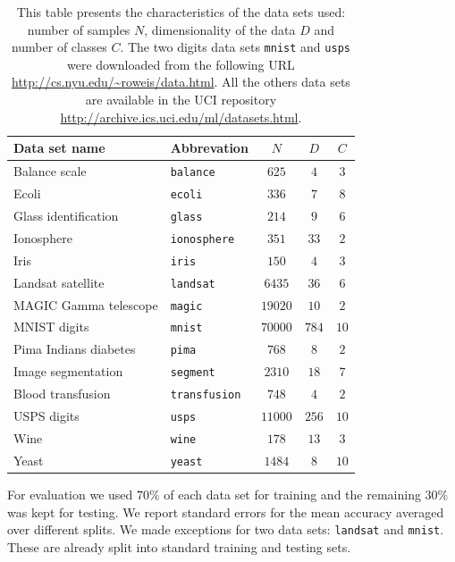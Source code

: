 \begin{table}%
  \centering
    \begin{tabular}{l l c c c} \toprule
	Data set name&Abbrevation&$N$&$D$&$C$\\ 
	\midrule
	Balance scale&\texttt{balance}&$625$&$4$&$3$\\ 
	Ecoli&\texttt{ecoli}&$336$&$7$&$8$\\ 
	Glass identification&\texttt{glass}&$214$&$9$&$6$\\ 
	Ionosphere&\texttt{ionosphere}&$351$&$33$&$2$\\ 
	Iris&\texttt{iris}&$150$&$4$&$3$\\ 
	Landsat satellite&\texttt{landsat}&$6435$&$36$&$6$\\ 
	MAGIC Gamma telescope&\texttt{magic}&$19020$&$10$&$2$\\ 
	MNIST digits&\texttt{mnist}&$70000$&$784$&$10$\\ 
	Pima Indians diabetes&\texttt{pima}&$768$&$8$&$2$\\ 
	Image segmentation&\texttt{segment}&$2310$&$18$&$7$\\ 
	Blood transfusion&\texttt{transfusion}&$748$&$4$&$2$\\ 
	USPS digits&\texttt{usps}&$11000$&$256$&$10$\\ 
	Wine&\texttt{wine}&$178$&$13$&$3$\\ 
	Yeast&\texttt{yeast}&$1484$&$8$&$10$\\  
      \bottomrule
    \end{tabular}
    \caption[List of the data sets used for evaluation]{This table presents the characteristics of the data sets used: number of samples $N$, dimensionality of the data $D$ and number of classes $C$. The two digits data sets \texttt{mnist} and \texttt{usps} were downloaded from the following URL \protect\url{http://cs.nyu.edu/~roweis/data.html}. All the others data sets are available in the UCI repository \protect\url{http://archive.ics.uci.edu/ml/datasets.html}.}
    \label{tab:datasets}
\end{table}

For evaluation we used $70\%$ of each data set for training and the remaining $30\%$ was kept for testing. We report standard errors for the mean accuracy averaged over different splits.
We made exceptions for two data sets: \texttt{landsat} and \texttt{mnist}. These are already split into standard training and testing sets. 

